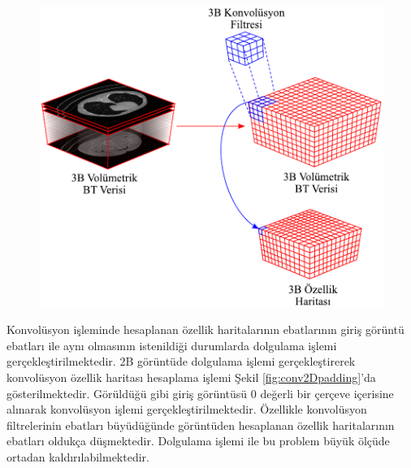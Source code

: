 \begin{figure}[h!]
	\begin{center}
		\vspace{0.4cm}
		{
			\vspace{0.4cm}
			\includegraphics[scale=0.7]{Yapilan-Calismalar/Figures/conv3D.pdf}
		}
	\end{center}
\end{figure}

Konvolüsyon işleminde hesaplanan özellik haritalarının ebatlarının giriş görüntü ebatları ile aynı olmasının istenildiği durumlarda dolgulama işlemi gerçekleştirilmektedir. 2B görüntüde dolgulama işlemi gerçekleştirerek konvolüsyon özellik haritası hesaplama işlemi Şekil \ref{fig:conv2Dpadding}'da gösterilmektedir. Görüldüğü gibi giriş görüntüsü $0$ değerli bir çerçeve içerisine alınarak konvolüsyon işlemi gerçekleştirilmektedir. Özellikle konvolüsyon filtrelerinin ebatları büyüdüğünde görüntüden hesaplanan özellik haritalarının ebatları oldukça düşmektedir. Dolgulama işlemi ile bu problem büyük ölçüde ortadan kaldırılabilmektedir.

